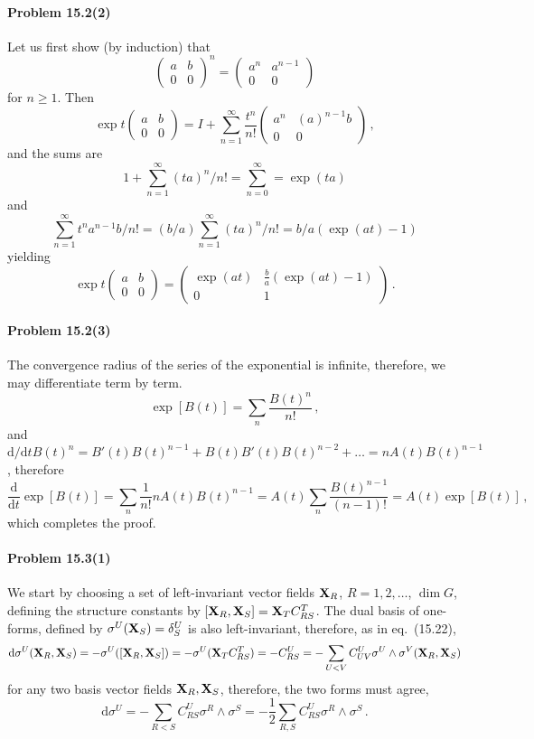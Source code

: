\documentclass[a4paper,12pt]{article}
\def\d{\mathrm{d}}
\newcommand{\problem}[1]{\paragraph{Problem #1}}
\begin{document}
\problem{15.2(2)} Let us first show (by induction) that
\[
 \begin{pmatrix} a & b \\ 0 & 0 \end{pmatrix}^n = \begin{pmatrix} a^n & a^{n-1} \\ 0 & 0 \end{pmatrix}
\]
for $n\ge 1$. Then
\[
 \exp t \begin{pmatrix} a & b \\ 0 & 0 \end{pmatrix} = I+\sum_{n=1}^\infty \frac{t^n}{n!} \begin{pmatrix} a^n & (a)^{n-1}b \\ 0 & 0 \end{pmatrix}\,,
 \]
and the sums are
\[
1+\sum_{n=1}^\infty (ta)^n/n! = \sum_{n=0}^\infty = \exp(ta)
\]
and
\[\sum_{n=1}^\infty t^n a^{n-1}b/n!= (b/a)\sum_{n=1}^\infty (ta)^n/n!= b/a(\exp(at)-1)
\]
 yielding
\[
 \exp t \begin{pmatrix} a & b \\ 0 & 0 \end{pmatrix} = \begin{pmatrix} \exp(at) & \frac{b}{a}(\exp(at)-1) \\ 0 & 1 \end{pmatrix}\,.
\]


\problem{15.2(3)} The convergence radius of the series of the exponential is infinite, therefore, we may differentiate term by term.
\[
 \exp[B(t)] = \sum_n \frac{B(t)^n}{n!}\,,
\]
and $\d / \d t B(t)^n = B'(t) B(t)^{n-1} + B(t) B'(t) B(t)^{n-2}+\dots = n A(t) B(t)^{n-1}$, therefore
\[
 \frac{\d}{\d t}\exp[B(t)] = \sum_n \frac{1}{n!} n A(t) B(t)^{n-1} = A(t)\sum_n \frac{B(t)^{n-1}}{(n-1)!} = A(t)\exp[B(t)]\,,
\]
which completes the proof.


\problem{15.3(1)} We start by choosing a set of left-invariant vector fields ${\bf X}_R$, $R=1, 2, \dots$, $\dim G$, defining the structure constants by $[{\bf X}_R, {\bf X}_S] = {\bf X}_T C^T_{RS}$. The dual basis of one-forms, defined by $\sigma^U({\bf X}_S)=\delta^U_S$ is also left-invariant, therefore, as in eq.\ (15.22),
\[
 \d\sigma^U ({\bf X}_R, {\bf X}_S)=-\sigma^U([{\bf X}_R, {\bf X}_S]) = -\sigma^U({\bf X}_T C^T_{RS}) = -C^U_{RS} = -\sum_{U<V}C^U_{UV}\sigma^U\wedge\sigma^V({\bf X}_R, {\bf X}_S)
\]
for any two basis vector fields ${\bf X}_R, {\bf X}_S$, therefore, the two forms must agree,
\[
 \d\sigma^U = -\sum_{R<S}C^U_{RS}\sigma^R\wedge\sigma^S = -\frac{1}{2}\sum_{R, S}C^U_{RS}\sigma^R\wedge\sigma^S\,.
\]
\end{document}
